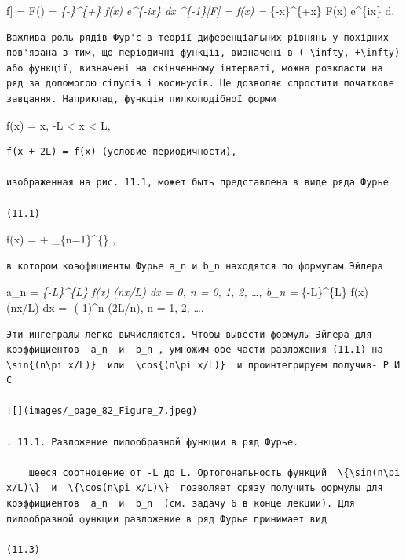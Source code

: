 \documentclass[
  ukrainian,
]{article}
\begin{document}
\mathcal{F}{[}f{]} = F(\xi) = 
\int\emph{\{-\infty\}\^{}\{+\infty\} f(x) e\^{}\{-i\xi x\} dx
\qquad {} \^{}\{-1\}{[}F{]} =
f(x) =  \int}\{-x\}\^{}\{+x\} F(x) e\^{}\{i\xi x\}
d\xi \qquad {}.

\begin{verbatim}
Важлива роль рядів Фур'є в теорії диференціальних рівнянь у похідних пов'язана з тим, що періодичні функції, визначені в (-\infty, +\infty) або функції, визначені на скінченному інтерваті, можна розкласти на ряд за допомогою сіпусів і косинусів. Це дозволяє спростити початкове завдання. Наприклад, функція пилкоподібної форми
\end{verbatim}

f(x) = x, -L \textless{} x \textless{} L,

\begin{verbatim}
f(x + 2L) = f(x) (условие периодичности),

изображенная на рис. 11.1, может быть представлена в виде ряда Фурье

(11.1)
\end{verbatim}

f(x) =  + \sum\_\{n=1\}\^{}\{\infty\}
,

\begin{verbatim}
в котором коэффициенты Фурье a_n и b_n находятся по формулам Эйлера
\end{verbatim}

a\_n =  \int\emph{\{-L\}\^{}\{L\} f(x) \cos(n\pi x/L) dx = 0,
\quad n = 0, 1, 2, \dots, b\_n =  \int}\{-L\}\^{}\{L\} f(x)
\sin(n\pi x/L) dx = -(-1)\^{}n (2L/n\pi), \quad n = 1, 2, \dots.

\begin{verbatim}
Эти ингегралы легко вычисляются. Чтобы вывести формулы Эйлера для коэффициентов  a_n  и  b_n , умножим обе части разложения (11.1) на  \sin{(n\pi x/L)}  или  \cos{(n\pi x/L)}  и проинтегрируем получив- Р И С

![](images/_page_82_Figure_7.jpeg)

. 11.1. Разложение пилообразной функции в ряд Фурье.

    шееся соотношение от -L до L. Ортогональность функций  \{\sin(n\pi x/L)\}  и  \{\cos(n\pi x/L)\}  позволяет срязу получить формулы для коэффициентов  a_n  и  b_n  (см. задачу 6 в конце лекции). Для пилообразной функции разложение в ряд Фурье принимает вид

(11.3)
\end{verbatim}
\end{document}
